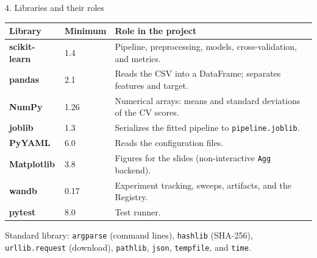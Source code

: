 \begin{frame}{4. Libraries and their roles}
\begingroup\footnotesize
\begin{tabularx}{\textwidth}{>{\bfseries}l l X}
Library & Minimum & Role in the project \\
\toprule
scikit-learn & 1.4 & Pipeline, preprocessing, models, cross-validation, and metrics. \\
\addlinespace[0.25em]
pandas & 2.1 & Reads the CSV into a DataFrame; separates features and target. \\
\addlinespace[0.25em]
NumPy & 1.26 & Numerical arrays: means and standard deviations of the CV scores. \\
\addlinespace[0.25em]
joblib & 1.3 & Serializes the fitted pipeline to \texttt{pipeline.joblib}. \\
\addlinespace[0.25em]
PyYAML & 6.0 & Reads the configuration files. \\
\addlinespace[0.25em]
Matplotlib & 3.8 & Figures for the slides (non-interactive \texttt{Agg} backend). \\
\addlinespace[0.25em]
wandb & 0.17 & Experiment tracking, sweeps, artifacts, and the Registry. \\
\addlinespace[0.25em]
pytest & 8.0 & Test runner. \\
\bottomrule
\end{tabularx}
\par\endgroup
\vspace{0.3em}
{\scriptsize Standard library: \texttt{argparse} (command lines), \texttt{hashlib} (SHA-256), \texttt{urllib.request} (download), \texttt{pathlib}, \texttt{json}, \texttt{tempfile}, and \texttt{time}.\par}
\coursefooter
\end{frame}


